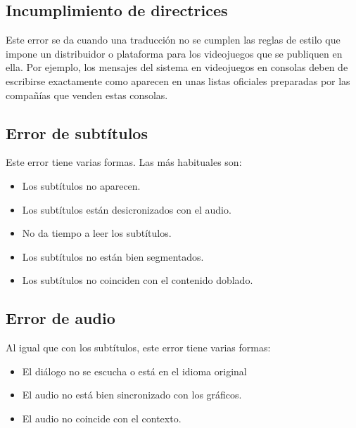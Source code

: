 \subsection{Incumplimiento de directrices}\label{ErrorDirectrices}
Este error se da cuando una traducción no se cumplen las reglas de estilo que impone un distribuidor o plataforma para los videojuegos que se publiquen en ella. Por ejemplo, los mensajes del sistema en videojuegos en consolas deben de escribirse exactamente como aparecen en unas listas oficiales preparadas por las compañías que venden estas consolas.

\subsection{Error de subtítulos}\label{ErrorSubtitulos}
Este error tiene varias formas. Las más habituales son:
\begin{itemize}
	\item Los subtítulos no aparecen.
	\item Los subtítulos están desicronizados con el audio.
	\item No da tiempo a leer los subtítulos.
	\item Los subtítulos no están bien segmentados.
	\item Los subtítulos no coinciden con el contenido doblado. 
\end{itemize}

\subsection{Error de audio}\label{ErrorAudio}
Al igual que con los subtítulos, este error tiene varias formas:
\begin{itemize}
	\item El diálogo no se escucha o está en el idioma original
	\item El audio no está bien sincronizado con los gráficos.
	\item El audio no coincide con el contexto.
\end{itemize}

